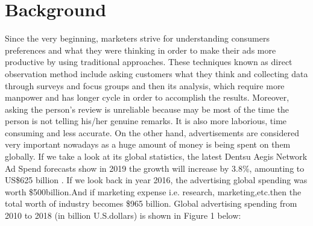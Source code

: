 \documentclass[a4paper, 12pt, oneside]{uet_thesis}
\begin{document}
\section{Background}
Since the very beginning, marketers strive for understanding consumers preferences and what they were thinking in order to make their ads more productive by using traditional approaches. These techniques known as direct observation method include asking customers what they think and collecting data through surveys and focus groups and then its analysis, which require more manpower and has longer cycle in order to accomplish the results. Moreover, asking the person's review is unreliable because may be most of the time the person is not telling his/her genuine remarks. It is also more laborious, time consuming and less accurate. On the other hand, advertisements are considered very important nowadays as a huge amount of money is being spent on them globally. If we take a look at its global statistics, the latest Dentsu Aegis Network Ad Spend forecasts show in 2019 the growth will increase by 3.8\%, amounting to US\$625 billion \cite{b1}. If we look back in year 2016, the advertising global spending was worth \$500billion\cite{b2}.And if marketing expense i.e. research, marketing,etc.then the total worth of industry
becomes \$965 billion. Global advertising spending from 2010 to 2018 (in billion U.S.dollars) is shown in Figure 1 \cite{b3} below:
\end{document}
